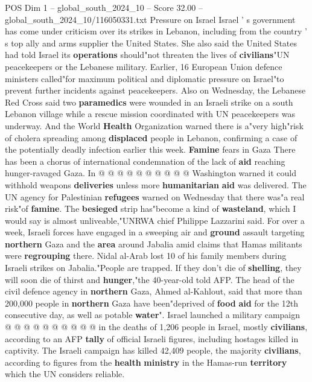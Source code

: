 \begin{textsample}{POS Dim 1 – global\_south\_2024\_10 – Score 32.00 – global\_south\_2024\_10/116050331.txt}
Pressure on Israel Israel ' s government has come under criticism over its strikes in Lebanon, including from the country ' s top ally and arms supplier the United States.
She also said the United States had told Israel its \textbf{operations} should"not threaten the lives of \textbf{civilians}"UN peacekeepers or the Lebanese military.
Earlier, 16 European Union defence ministers called"for maximum political and diplomatic pressure on Israel"to prevent further incidents against peacekeepers.
Also on Wednesday, the Lebanese Red Cross said two \textbf{paramedics} were wounded in an Israeli strike on a south Lebanon village while a rescue mission coordinated with UN peacekeepers was underway.
And the World \textbf{Health} Organization warned there is a"very high"risk of cholera spreading among \textbf{displaced} people in Lebanon, confirming a case of the potentially deadly infection earlier this week. \textbf{Famine} fears in Gaza There has been a chorus of international condemnation of the lack of \textbf{aid} reaching hunger-ravaged Gaza.
In @ @ @ @ @ @ @ @ @ @ Washington warned it could withhold weapons \textbf{deliveries} unless more \textbf{humanitarian} \textbf{aid} was delivered.
The UN agency for Palestinian \textbf{refugees} warned on Wednesday that there was"a real risk"of \textbf{famine}.
The \textbf{besieged} strip has"become a kind of \textbf{wasteland}, which I would say is almost unliveable,"UNRWA chief Philippe Lazzarini said.
For over a week, Israeli forces have engaged in a sweeping air and \textbf{ground} assault targeting \textbf{northern} Gaza and the \textbf{area} around Jabalia amid claims that Hamas militants were \textbf{regrouping} there.
Nidal al-Arab lost 10 of his family members during Israeli strikes on Jabalia."People are trapped.
If they don't die of \textbf{shelling}, they will soon die of thirst and \textbf{hunger},"the 40-year-old told AFP.
The head of the civil defence agency in \textbf{northern} Gaza, Ahmed al-Kahlout, said that more than 200,000 people in \textbf{northern} Gaza have been"deprived of \textbf{food} \textbf{aid} for the 12th consecutive day, as well as potable \textbf{water}".
Israel launched a military campaign @ @ @ @ @ @ @ @ @ @ in the deaths of 1,206 people in Israel, mostly \textbf{civilians}, according to an AFP \textbf{tally} of official Israeli figures, including hostages killed in captivity.
The Israeli campaign has killed 42,409 people, the majority \textbf{civilians}, according to figures from the \textbf{health} \textbf{ministry} in the Hamas-run \textbf{territory} which the UN considers reliable.

\end{textsample}
